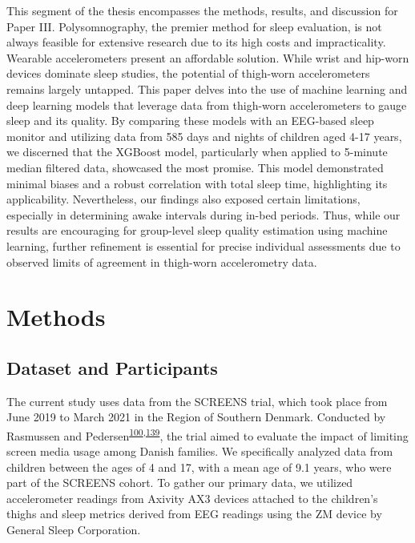 \documentclass[
  10pt,
]{scrbook}
\begin{document}
This segment of the thesis encompasses the methods, results, and
discussion for Paper III. Polysomnography, the premier method for sleep
evaluation, is not always feasible for extensive research due to its
high costs and impracticality. Wearable accelerometers present an
affordable solution. While wrist and hip-worn devices dominate sleep
studies, the potential of thigh-worn accelerometers remains largely
untapped. This paper delves into the use of machine learning and deep
learning models that leverage data from thigh-worn accelerometers to
gauge sleep and its quality. By comparing these models with an EEG-based
sleep monitor and utilizing data from 585 days and nights of children
aged 4-17 years, we discerned that the XGBoost model, particularly when
applied to 5-minute median filtered data, showcased the most promise.
This model demonstrated minimal biases and a robust correlation with
total sleep time, highlighting its applicability. Nevertheless, our
findings also exposed certain limitations, especially in determining
awake intervals during in-bed periods. Thus, while our results are
encouraging for group-level sleep quality estimation using machine
learning, further refinement is essential for precise individual
assessments due to observed limits of agreement in thigh-worn
accelerometry data.

\hypertarget{methods-2}{%
\section{Methods}\label{methods-2}}

\hypertarget{dataset-and-participants}{%
\subsection{Dataset and Participants}\label{dataset-and-participants}}

The current study uses data from the SCREENS trial, which took place
from June 2019 to March 2021 in the Region of Southern Denmark.
Conducted by Rasmussen and
Pedersen\textsuperscript{\protect\hyperlink{ref-rasmussen_short-term_2020}{100},\protect\hyperlink{ref-pedersen_effects_2022}{139}},
the trial aimed to evaluate the impact of limiting screen media usage
among Danish families. We specifically analyzed data from children
between the ages of 4 and 17, with a mean age of 9.1 years, who were
part of the SCREENS cohort. To gather our primary data, we utilized
accelerometer readings from Axivity AX3 devices attached to the
children's thighs and sleep metrics derived from EEG readings using the
ZM device by General Sleep Corporation.
\end{document}
